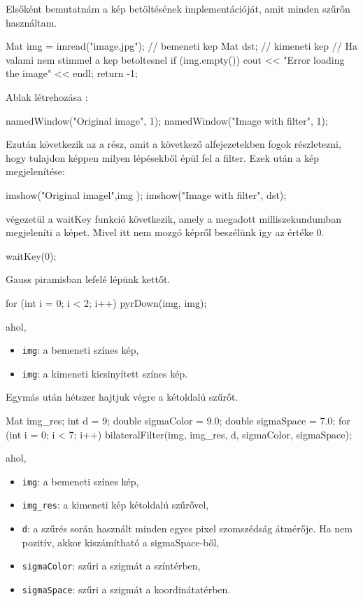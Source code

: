 Elsőként bemutatnám a kép betöltésének implementációját, amit minden szűrőn használtam.
\begin{cpp}
Mat img = imread("image.jpg"); // bemeneti kep
Mat dst; // kimeneti kep
// Ha valami nem stimmel a kep betoltesnel
if (img.empty()) {
    cout << "Error loading the image" << endl;
    return -1;
}
\end{cpp} 
Ablak létrehozása :
\begin{cpp}
namedWindow("Original image", 1);
namedWindow("Image with filter", 1);
\end{cpp}
Ezután következik az a rész, amit a következő alfejezetekben fogok részletezni, hogy tulajdon képpen milyen lépésekből épül fel a filter. Ezek után a kép megjelenítése:
\begin{cpp}
imshow("Original imagel",img );
imshow("Image with filter", dst);
\end{cpp} 
\newpage
{} végezetül a waitKey funkció következik, amely a megadott milliszekundumban megjeleníti a képet. Mivel itt nem mozgó képről beszélünk igy az értéke 0.
\begin{cpp}
waitKey(0);
\end{cpp}
Gauss piramisban lefelé lépünk kettőt.
\begin{cpp}
for (int i = 0; i < 2; i++) {
    pyrDown(img, img);
}
\end{cpp}
ahol,
\begin{itemize}
    \item \texttt{img}: a bemeneti színes kép,
    \item \texttt{img}: a kimeneti kicsinyített színes kép.
\end{itemize}
Egymás után hétszer hajtjuk végre a kétoldalú szűrőt.
\begin{cpp}
Mat img_res;
int d = 9;
double sigmaColor = 9.0;
double sigmaSpace = 7.0;
for (int i = 0; i < 7; i++) {
    bilateralFilter(img, img_res, d, sigmaColor, sigmaSpace);
}
\end{cpp}
ahol,
\begin{itemize}
    \item \texttt{img}: a bemeneti színes kép,
    \item \texttt{img\_res}: a kimeneti kép kétoldalú szűrővel,
    \item \texttt{d}: a szűrés során használt minden egyes pixel szomszédság átmérője. Ha nem pozitív, akkor kiszámítható a sigmaSpace-ből,
    \item \texttt{sigmaColor}: szűri a szigmát a színtérben,
    \item \texttt{sigmaSpace}: szűri a szigmát a koordinátatérben.
\end{itemize}
